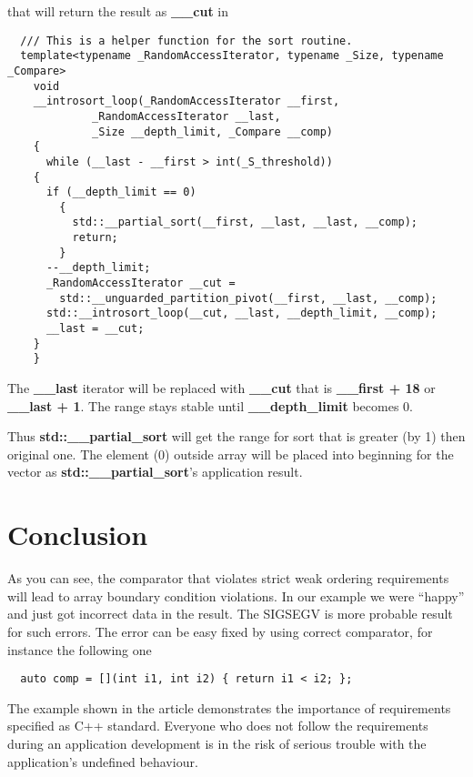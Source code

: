 \documentclass[14pt,a4paper]{article}
\begin{document}
that will return the result as \textbf{\_\_cut} in 
\begin{verbatim}
  /// This is a helper function for the sort routine.
  template<typename _RandomAccessIterator, typename _Size, typename _Compare>
    void
    __introsort_loop(_RandomAccessIterator __first,
		     _RandomAccessIterator __last,
		     _Size __depth_limit, _Compare __comp)
    {
      while (__last - __first > int(_S_threshold))
	{
	  if (__depth_limit == 0)
	    {
	      std::__partial_sort(__first, __last, __last, __comp);
	      return;
	    }
	  --__depth_limit;
	  _RandomAccessIterator __cut =
	    std::__unguarded_partition_pivot(__first, __last, __comp);
	  std::__introsort_loop(__cut, __last, __depth_limit, __comp);
	  __last = __cut;
	}
    }
\end{verbatim}
The \textbf{\_\_last} iterator will be replaced with \textbf{\_\_cut}
that is \textbf{\_\_first + 18} or \textbf{\_\_last + 1}. The range
stays stable until \textbf{\_\_depth\_limit} becomes 0.

Thus \textbf{std::\_\_partial\_sort} will get the range for sort that is
greater (by 1) then original one.  The element ($0$) outside
array will be placed into beginning for the vector as
\textbf{std::\_\_partial\_sort}'s application result.   

\section*{Conclusion}
As you can see, the comparator that violates strict weak ordering
requirements will lead to array boundary condition violations. In our
example we were ``happy'' and just got incorrect data in the result. The
SIGSEGV is more probable result for such errors. The error can be easy
fixed by using correct comparator, for instance the following one
\begin{verbatim}
  auto comp = [](int i1, int i2) { return i1 < i2; };
\end{verbatim}

The example shown in the article demonstrates the importance of
requirements specified as C++ standard. Everyone who does not follow
the requirements during an application development is in the risk of
serious trouble with the application's undefined behaviour. 

  
     
\end{document}
